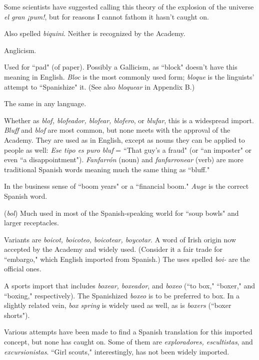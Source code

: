  Some scientists have suggested calling this theory
of the explosion of the universe \emph{el gran ¡pum!}, but for reasons I cannot
fathom it hasn't caught on.

 Also spelled \emph{biquini}. Neither is recognized by the
Academy.

 Anglicism.

 Used for ``pad" (of paper). Possibly a Gallicism, as
``block" doesn't have this meaning in English. \emph{Bloc} is the most commonly used form; \emph{bloque} is the linguists' attempt to ``Spanishize" it.
(See also \emph{bloquear} in Appendix B.)

 The same in any language.

 Whether as \emph{blof, blofeador, blofear, blofero}, or \emph{blufar},
this is a widespread import. \emph{Bluff} and \emph{blof} are most common, but none
meets with the approval of the Academy. They are used as in English,
except as nouns they can be applied to people as well: \emph{Ese tipo es puro
bluf} = ``That guy's a fraud" (or ``an imposter" or even ``a disappointment"). \emph{Fanfarrón} (noun) and \emph{fanfarronear} (verb) are more traditional
Spanish words meaning much the same thing as ``bluff."

 In the business sense of ``boom years" or a ``financial
boom." \emph{Auge} is the correct Spanish word.

 (\emph{bol}) Much used in most of the Spanish-speaking
world for ``soup bowls" and larger receptacles.

 Variants are \emph{boicot, boicoteo, boicotear, boycotar}.
A word of Irish origin now accepted by the Academy and widely used.
(Consider it a fair trade for ``embargo," which English imported from
Spanish.) The uses spelled \emph{boi-} are the official ones.

 A sports import that includes \emph{boxear, boxeador}, and
\emph{boxeo} (``to box," ``boxer," and ``boxing," respectively). The Spanishized
\emph{boxeo} is to be preferred to box. In a slightly related vein, \emph{box spring} is
widely used as well, as is \emph{boxers} (``boxer shorts").

 Various attempts have been made to find a Spanish translation for this imported concept, but none has caught on.
Some of them are \emph{exploradores, escultistas}, and \emph{excursionistas}. ``Girl
scouts," interestingly, has not been widely imported.

